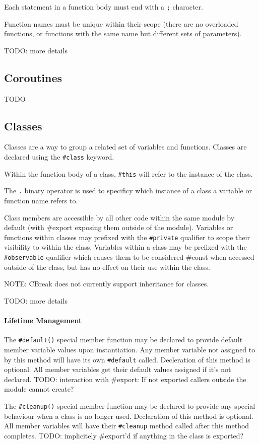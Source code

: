 \documentclass{article}
\newcommand{\code}[1]{\colorbox{light-gray}{\texttt{#1}}}
\newcommand{\breakingparagraph}[1]{\paragraph{#1}\mbox{}\medbreak}
\begin{document}
Each statement in a function body must end with a \code{;} character.

Function names must be unique within their scope (there are no overloaded functions, or functions with the same name but different sets of parameters).

TODO: more details

\subsection{Coroutines}

TODO

\subsection{Classes}

Classes are a way to group a related set of variables and functions.  Classes are declared using the \code{\#class} keyword.

Within the function body of a class, \code{\#this} will refer to the instance of the class.

The \code{.} binary operator is used to specificy which instance of a class a variable or function name refers to.

Class members are accessible by all other code within the same module by default (with \#export exposing them outside of the module).  Variables or functions within classes may prefixed with the \code{\#private} qualifier to scope their visibility to within the class.  Variables within a class may be prefixed with the \code{\#observable} qualifier which causes them to be considered \#const when accessed outside of the class, but has no effect on their use within the class.

NOTE: CBreak does not currently support inheritance for classes.

TODO: more details

\breakingparagraph{Lifetime Management}

The \code{\#default()} special member function may be declared to provide default member variable values upon instantiation.  Any member variable not assigned to by this method will have its own \code{\#default} called.  Decleration of this method is optional.  All member variables get their default values assigned if it's not declared.  TODO: interaction with \#export: If not exported callers outside the module cannot create?

The \code{\#cleanup()} special member function may be declared to provide any special behaviour when a class is no longer used.  Declaration of this method is optional.  All member variables will have their \code{\#cleanup} method called after this method completes. TODO: implicitely \#export'd if anything in the class is exported?
\end{document}

